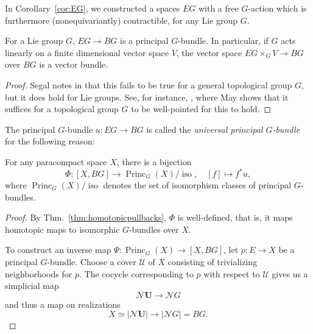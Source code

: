 \documentclass[a4paper,openany]{scrbook}
\DeclareMathOperator{\Princ}{Princ}
\newcommand{\nerve}{\mathcal N}
\begin{document}
In Corollary~\ref{cor:EG}, we constructed a spaces $EG$ with a free $G$-action which is furthermore (nonequivariantly) contractible, for any Lie group $G$. 

\begin{lemma}
For a Lie group $G$, $EG \to BG$ is a principal $G$-bundle. In particular, if $G$ acts linearly on a finite dimensional vector space $V$, the vector space $EG \times_G V \to BG$ over $BG$ is a vector bundle.
\end{lemma}
\begin{proof}
Segal notes in \cite{segal:68} that this fails to be true for a general topological group $G$, but it does hold for Lie groups. See, for instance, \cite{may:classifying-spaces}, where May shows that it suffices for a topological group $G$ to be well-pointed for this to hold.
\end{proof}

The principal $G$-bundle $u\colon EG \to BG$ is called the \emph{universal principal $G$-bundle} for the following reason:

\begin{thm}\label{thm:classifying-space}
For any paracompact space $X$, there is a bijection
\[
\Phi\colon [X,BG] \to \Princ_G(X)/\operatorname{iso}, \quad [f] \mapsto f^*u,
\]
where $\Princ_G(X)/\operatorname{iso}$ denotes the set of isomorphism classes of principal $G$-bundles.
\end{thm}
\begin{proof}
By Thm.~\ref{thm:homotopicpullbacks}, $\Phi$ is well-defined, that is, it maps homotopic maps to isomorphic $G$-bundles over $X$.

To construct an inverse map $\Psi\colon \Princ_G(X) \to [X,BG]$, let $p\colon E \to X$ be a principal $G$-bundle. Choose a cover $\mathcal U$ of $X$ consisting of trivializing neighborhoods for $p$. The cocycle corresponding to $p$ with respect to $\mathcal U$ gives us a simplicial map
\[
\nerve \mathbf U \to \nerve G
\]
and thus a map on realizations
\[
X \simeq |\nerve\mathbf U| \to |\nerve G| = BG.
\]
\end{proof}
\end{document}
